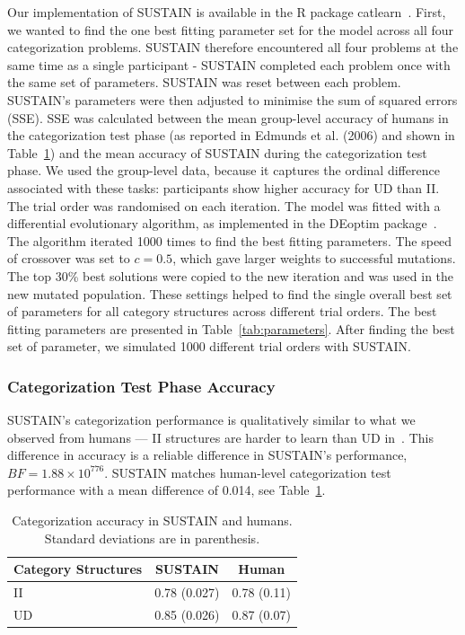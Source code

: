 \documentclass[10pt,letterpaper]{article}
\begin{document}
Our implementation of SUSTAIN is available in the R package
catlearn~\cite{wills2020}. First, we wanted to find the one best fitting
parameter set for the model across all four categorization problems. SUSTAIN
therefore encountered all four problems at the same time as a single participant
- SUSTAIN completed each problem once with the same set of parameters. SUSTAIN
was reset between each problem.
SUSTAIN's parameters were then adjusted to minimise the sum of squared errors (SSE).
SSE was calculated between the mean group-level accuracy of humans in the
categorization test phase
(as reported in Edmunds et al. (2006) and shown in Table~\ref{tab:accuracy})
and the mean accuracy of SUSTAIN during the
categorization test phase. We used the group-level data, because it
captures the ordinal difference associated with these tasks: participants
show higher accuracy for UD than II. The trial order was randomised on each iteration.
The model was fitted with a differential evolutionary algorithm, as implemented
in the DEoptim package~\cite{DEoptim}. The algorithm iterated
1000 times to find the best fitting parameters. The speed of crossover
was set to $c = 0.5$, which gave larger weights to successful
mutations. The top 30\% best solutions were copied to the new iteration and
was used in the new mutated population.
These settings helped to find the single overall best set of parameters
for all category structures across different trial orders. The best fitting
parameters are presented in Table~\ref{tab:parameters}.
After finding the best set of parameter, we simulated 1000 different
trial orders with SUSTAIN.



\subsubsection{Categorization Test Phase Accuracy}

SUSTAIN's categorization performance is qualitatively similar to what we
observed from humans --- II structures are harder to learn than UD
in~.
This difference in accuracy is a reliable difference in SUSTAIN's performance,
$BF = 1.88 \times 10^{776}$.
SUSTAIN matches human-level categorization test performance with a mean
difference of 0.014, see Table~\ref{tab:accuracy}.

\begin{table}[H]
\caption{\label{tab:accuracy} Categorization accuracy in SUSTAIN and humans.
Standard deviations are in parenthesis.}
\centering
\begin{tabular}[t]{lcc}
\hline
Category Structures & SUSTAIN & Human \\
\hline
II & 0.78 (0.027) & 0.78 (0.11) \\
UD & 0.85 (0.026) & 0.87 (0.07) \\
\hline
\end{tabular}
\end{table}
\end{document}
